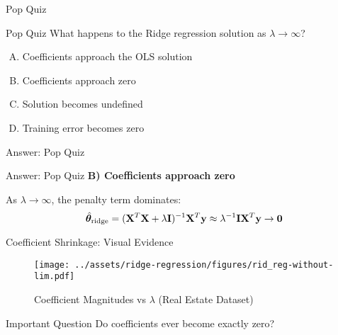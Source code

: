 \documentclass{beamer}
\begin{document}

\begin{frame}{Pop Quiz \thepopquiz}
\begin{popquizbox}{Pop Quiz \thepopquiz}
What happens to the Ridge regression solution as $\lambda \to \infty$?
\begin{enumerate}[A)]
\item Coefficients approach the OLS solution
\item Coefficients approach zero
\item Solution becomes undefined
\item Training error becomes zero
\end{enumerate}
\end{popquizbox}
\end{frame}

\begin{frame}{Answer: Pop Quiz \thepopquiz}
\begin{popquizbox}{Answer: Pop Quiz \thepopquiz}
\textbf{B) Coefficients approach zero}

\vspace{0.3cm}
As $\lambda \to \infty$, the penalty term dominates:
$$\hat{\boldsymbol{\theta}}_{\text{ridge}} = (\mathbf{X}^T\mathbf{X} + \lambda\mathbf{I})^{-1}\mathbf{X}^T\mathbf{y} \approx \lambda^{-1}\mathbf{I} \mathbf{X}^T\mathbf{y} \to \mathbf{0}$$
\end{popquizbox}
\end{frame}

\begin{frame}{Coefficient Shrinkage: Visual Evidence}
\begin{figure}\texttt{[image: ../assets/ridge-regression/figures/rid\_reg-without-lim.pdf]}\caption{{\footnotesize Coefficient Magnitudes vs $\lambda$ (Real Estate Dataset)}}
\end{figure}

\begin{alertbox}{Important Question}
Do coefficients ever become exactly zero?
\end{alertbox}
\end{frame}
\end{document}
